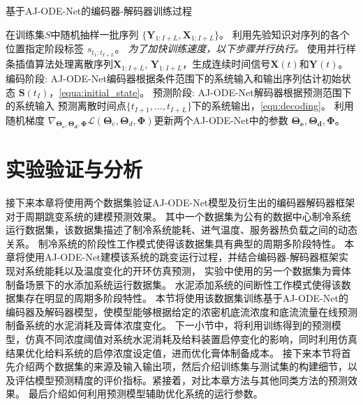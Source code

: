 \begin{algorithm*}[]
\caption{ 基于AJ-ODE-Net的编码器-解码器训练过程 }
\label{alg:training}
\begin{algorithmic}[1]
\State  在训练集$S$中随机抽样一批序列 $\{\boldsymbol{Y}_{1:I+L}, {\boldsymbol {X}}_{1:I+L}\}$。
\State 利用先验知识对序列的各个位置指定阶段标签 $s_{t_1:t_{I+L}}$。
\State \text{//}\textit{为了加快训练速度，以下步骤并行执行。}
\State 使用并行样条插值算法处理离散序列${\boldsymbol {X}}_{1:I+L}$, $\boldsymbol{Y}_{1:I+L}$，生成连续时间信号$\boldsymbol X(t)$和$\boldsymbol Y(t)$。
\State 编码阶段: AJ-ODE-Net编码器根据条件范围下的系统输入和输出序列估计初始状态 $\boldsymbol{S}\left(t_{I}\right)$，\eqref{equa:initial_state}。
\State 预测阶段: AJ-ODE-Net解码器根据预测范围下的系统输入 预测离散时间点$\{t_{I+1}, \dots, t_{I+L}\}$下的系统输出，\eqref{equ:decoding}。
\State 利用随机梯度 $\nabla_{\boldsymbol{\Theta_{e}}, \boldsymbol{\Theta_{d}}, \boldsymbol \Phi}\mathcal{L}\left(\boldsymbol{\Theta}_{e}, \boldsymbol{\Theta}_{d}, \boldsymbol{\Phi}\right)$更新两个AJ-ODE-Net中的参数 $\boldsymbol{\Theta_{e}}, \boldsymbol{\Theta_{d}}, \boldsymbol \Phi$。
\EndFor
\EndFor
\end{algorithmic}
\end{algorithm*}


\section{实验验证与分析}
\label{sec:4_evalutaion}
接下来本章将使用两个数据集验证AJ-ODE-Net模型及衍生出的编码器解码器框架对于周期跳变系统的建模预测效果。
其中一个数据集为公有的数据中心制冷系统运行数据集，该数据集描述了制冷系统能耗、进气温度、服务器热负载之间的动态关系。
制冷系统的阶段性工作模式使得该数据集具有典型的周期多阶段特性。
本章将使用AJ-ODE-Net建模该系统的跳变运行过程，并结合编码器-解码器框架实现对系统能耗以及温度变化的开环仿真预测，
实验中使用的另一个数据集为膏体制备场景下的水添加系统运行数据集。
水泥添加系统的间断性工作模式使得该数据集存在明显的周期多阶段特性。
本节将使用该数据集训练基于AJ-ODE-Net的编码器及解码器模型，使模型能够根据给定的浓密机底流浓度和底流流量在线预测制备系统的水泥消耗及膏体浓度变化。
下一小节中，将利用训练得到的预测模型，仿真不同浓度阈值对系统水泥消耗及给料装置启停变化的影响，同时利用仿真结果优化给料系统的启停浓度设定值，进而优化膏体制备成本。
接下来本节将首先介绍两个数据集的来源及输入输出项，然后介绍训练集与测试集的构建细节，以及评估模型预测精度的评价指标。紧接着，对比本章方法与其他同类方法的预测效果。
最后介绍如何利用预测模型辅助优化系统的运行参数。



